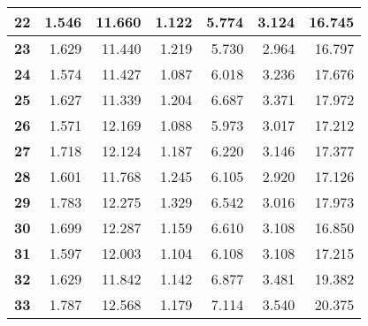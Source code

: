\documentclass[12pt]{article}
\begin{document}
\begin{table}[!htbp]
{\begin{tabular}{crrrrr|r|}
\multicolumn{1}{|c|}{\textbf{22}} & \multicolumn{1}{r|}{1.546} & \multicolumn{1}{r|}{11.660} & \multicolumn{1}{r|}{1.122} & \multicolumn{1}{r|}{5.774} & 3.124 & 16.745 \\ \hline
\multicolumn{1}{|c|}{\textbf{23}} & \multicolumn{1}{r|}{1.629} & \multicolumn{1}{r|}{11.440} & \multicolumn{1}{r|}{1.219} & \multicolumn{1}{r|}{5.730} & 2.964 & 16.797 \\ \hline
\multicolumn{1}{|c|}{\textbf{24}} & \multicolumn{1}{r|}{1.574} & \multicolumn{1}{r|}{11.427} & \multicolumn{1}{r|}{1.087} & \multicolumn{1}{r|}{6.018} & 3.236 & 17.676 \\ \hline
\multicolumn{1}{|c|}{\textbf{25}} & \multicolumn{1}{r|}{1.627} & \multicolumn{1}{r|}{11.339} & \multicolumn{1}{r|}{1.204} & \multicolumn{1}{r|}{6.687} & 3.371 & 17.972 \\ \hline
\multicolumn{1}{|c|}{\textbf{26}} & \multicolumn{1}{r|}{1.571} & \multicolumn{1}{r|}{12.169} & \multicolumn{1}{r|}{1.088} & \multicolumn{1}{r|}{5.973} & 3.017 & 17.212 \\ \hline
\multicolumn{1}{|c|}{\textbf{27}} & \multicolumn{1}{r|}{1.718} & \multicolumn{1}{r|}{12.124} & \multicolumn{1}{r|}{1.187} & \multicolumn{1}{r|}{6.220} & 3.146 & 17.377 \\ \hline
\multicolumn{1}{|c|}{\textbf{28}} & \multicolumn{1}{r|}{1.601} & \multicolumn{1}{r|}{11.768} & \multicolumn{1}{r|}{1.245} & \multicolumn{1}{r|}{6.105} & 2.920 & 17.126 \\ \hline
\multicolumn{1}{|c|}{\textbf{29}} & \multicolumn{1}{r|}{1.783} & \multicolumn{1}{r|}{12.275} & \multicolumn{1}{r|}{1.329} & \multicolumn{1}{r|}{6.542} & 3.016 & 17.973 \\ \hline
\multicolumn{1}{|c|}{\textbf{30}} & \multicolumn{1}{r|}{1.699} & \multicolumn{1}{r|}{12.287} & \multicolumn{1}{r|}{1.159} & \multicolumn{1}{r|}{6.610} & 3.108 & 16.850 \\ \hline
\multicolumn{1}{|c|}{\textbf{31}} & \multicolumn{1}{r|}{1.597} & \multicolumn{1}{r|}{12.003} & \multicolumn{1}{r|}{1.104} & \multicolumn{1}{r|}{6.108} & 3.108 & 17.215 \\ \hline
\multicolumn{1}{|c|}{\textbf{32}} & \multicolumn{1}{r|}{1.629} & \multicolumn{1}{r|}{11.842} & \multicolumn{1}{r|}{1.142} & \multicolumn{1}{r|}{6.877} & 3.481 & 19.382 \\ \hline
\multicolumn{1}{|c|}{\textbf{33}} & \multicolumn{1}{r|}{1.787} & \multicolumn{1}{r|}{12.568} & \multicolumn{1}{r|}{1.179} & \multicolumn{1}{r|}{7.114} & 3.540 & 20.375 \\ \hline

\end{tabular}}
\end{table}
\end{document}
